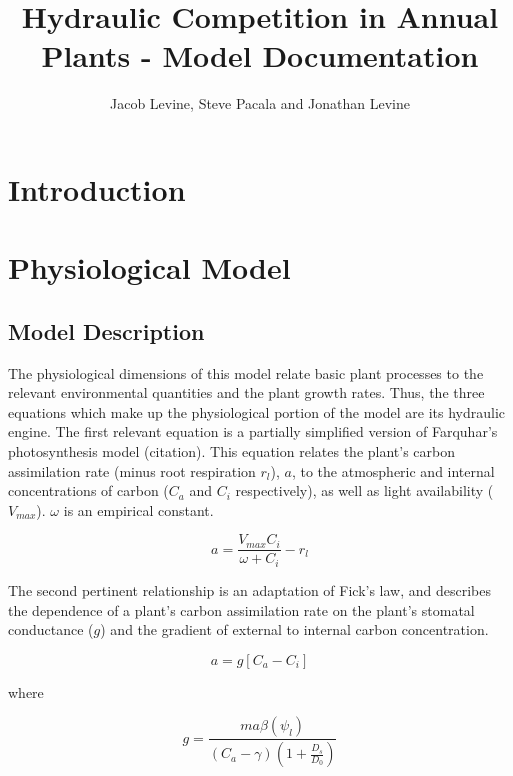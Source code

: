 \documentclass{article}
\title{Hydraulic Competition in Annual Plants - Model Documentation}
\author{Jacob Levine, Steve Pacala and Jonathan Levine}
\date{}
\begin{document}
  \maketitle

  \section{Introduction}

  \section{Physiological Model}

  \subsection{Model Description} \label{model description}

  The physiological dimensions of this model relate basic plant processes to the
  relevant environmental quantities and the plant growth rates. Thus, the
  three equations which make up the physiological portion of the model are its
  hydraulic engine. The first relevant equation is a partially simplified
  version of Farquhar's photosynthesis model (citation). This equation relates
  the plant's carbon assimilation rate (minus root respiration $r_{l}$), $a$, to the atmospheric and internal concentrations of
  carbon ($C_{a}$ and $C_{i}$ respectively), as well as light availability
  ($V_{max}$). $\omega$ is an empirical constant.


  \begin{equation} \label{eq:Farquhar}
    a = \frac{V_{max}C_{i}}{\omega + C_{i}} - r_{l}
  \end{equation}

  The second pertinent relationship is an adaptation of Fick's law, and
  describes the dependence of a plant's carbon assimilation rate on the
  plant's stomatal conductance ($g$) and the gradient of external to
  internal carbon concentration.

  \begin{equation} \label{eq:Fick's Law}
    a = g[C_{a} - C_{i}]
  \end{equation}

  where

  $$g = \frac{m a \beta(\psi_{l})}{(C_{a} - \gamma)(1 + \frac{D_{s}}{D_{0}})}$$
\end{document}
